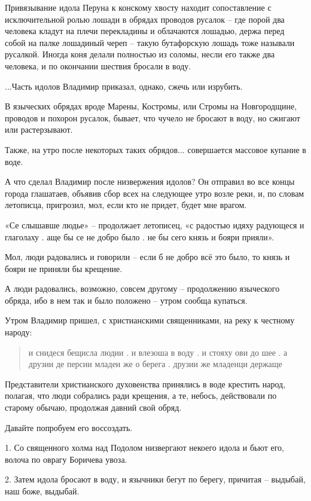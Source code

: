    Привязывание идола Перуна к конскому хвосту находит сопоставление с исключительной ролью лошади в обрядах проводов русалок – где порой два человека кладут на плечи перекладины и облачаются лошадью, держа перед собой на палке лошадиный череп – такую бутафорскую лошадь тоже называли русалкой. Иногда коня делали полностью из соломы, несли его также два человека, и по окончании шествия бросали в воду.

   ...Часть идолов Владимир приказал, однако, сжечь или изрубить.

   В языческих обрядах вроде Марены, Костромы, или Стромы на Новгородщине, проводов и похорон русалок, бывает, что чучело не бросают в воду, но сжигают или растерзывают. 

   Также, на утро после некоторых таких обрядов... совершается массовое купание в воде.

   А что сделал Владимир после низвержения идолов? Он отправил во все концы города глашатаев, объявив сбор всех на следующее утро возле реки, и, по словам летописца, пригрозил, мол, если кто не придет, будет мне врагом.

«Се слышавше людье» – продолжает летописец, «с радостью идяху радующеся и глаголаху . аще бы се не добро было . не бы сего князь и бояри прияли».

   Мол, люди радовались и говорили – если б не добро всё это было, то князь и бояри не приняли бы крещение. 

   А люди радовались, возможно, совсем другому – продолжению языческого обряда, ибо в нем так и было положено – утром сообща купаться.

   Утром Владимир пришел, с христианскими священниками, на реку к честному народу:
 
\begin{quotation}
и снидеся бещисла людии . и влезоша в воду . и стояху ови до шее . а друзии де персии младеи же о берега . друзии же младенци держаще
\end{quotation}

Представители христианского духовенства принялись в воде крестить народ, полагая, что люди собрались ради крещения, а те, небось, действовали по старому обычаю, продолжая давний свой обряд.

   Давайте попробуем его воссоздать.

1. Со священного холма над Подолом  низвергают некоего идола и бьют его, волоча по оврагу Боричева увоза. 

2. Затем идола бросают в воду, и язычники бегут по берегу, причитая – выдыбай, наш боже, выдыбай.


